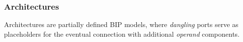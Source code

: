 \documentclass{llncs}
\newcommand{\Simon}{\\\hfill\mdash Simon}
\newcommand{\noteSB}[2][color=green!40, size=\tiny]{\todo[#1]{{#2}\Simon}}
\newcommand{\Ludo}{\\\hfill\mdash Ludo}
\newcommand{\noteLH}[2][color=orange!40, size=\tiny]{\todo[#1]{{#2}\Ludo}}
\newcommand{\noteLHin}[2][inline,color=orange!40]{\todo[#1]{{#2}\Ludo}}
\newcommand{\mdash}[1][]{---#1}
\begin{document}






\subsubsection{Architectures}
\label{secn:archi}

Architectures are partially defined BIP models, where \emph{dangling}
ports serve as placeholders for the eventual connection with
additional \emph{operand} components.



\end{document}
